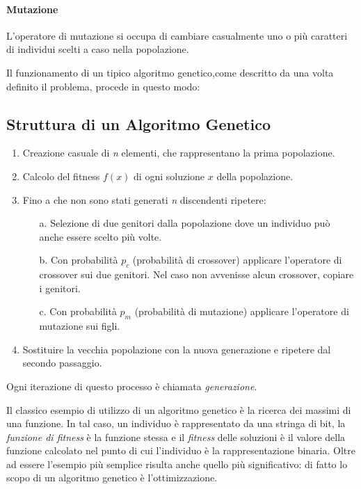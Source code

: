 \documentclass[12pt,a4paper]{report}
\begin{document}
\paragraph{Mutazione} L'operatore di mutazione si occupa di cambiare casualmente uno o più caratteri di individui scelti a caso nella popolazione.

Il funzionamento di un tipico algoritmo genetico,come descritto da \cite{genetic-algorithm-mitchell} una volta definito il problema,  procede in questo modo:

\subsection{Struttura di un Algoritmo Genetico}

\begin{enumerate}
 \item Creazione casuale di \textit{n} elementi, che rappresentano la prima popolazione. 
 \item Calcolo del fitness $f(x)$ di ogni soluzione $x$ della popolazione.
 \item Fino a che non sono stati generati \textit{n} discendenti ripetere:
 \begin{enumerate}
  \item[a.] Selezione di due genitori dalla popolazione dove un individuo può anche essere scelto più volte.
  \item[b.] Con probabilità $p_{c}$ (probabilità di crossover) applicare l'operatore di crossover sui due genitori. Nel caso non avvenisse alcun crossover, copiare i genitori.
  \item[c.] Con probabilità $p_{m}$ (probabilità di mutazione) applicare l'operatore di mutazione sui figli.
 \end{enumerate}
 \item Sostituire la vecchia popolazione con la nuova generazione e ripetere dal secondo passaggio.
\end{enumerate}

Ogni iterazione di questo processo è chiamata \textit{generazione}.

Il classico esempio di utilizzo di un algoritmo genetico è la ricerca dei massimi di una funzione.
In tal caso, un individuo è rappresentato da una stringa di bit, la \textit{funzione di fitness} è la funzione stessa e il \textit{fitness} delle soluzioni è il valore della funzione calcolato nel punto di cui l'individuo è la rappresentazione binaria.
Oltre ad essere l'esempio più semplice risulta anche quello più significativo: di fatto lo scopo di un algoritmo genetico è l'ottimizzazione.  
\end{document}
